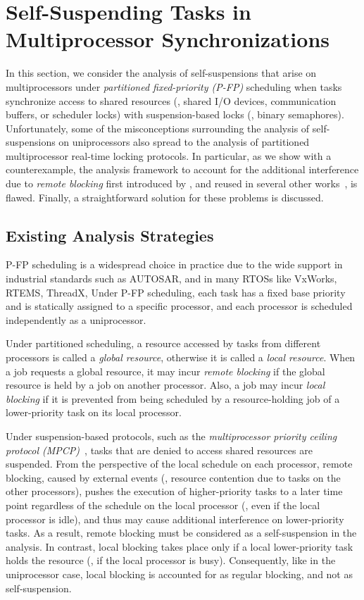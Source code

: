 \section{Self-Suspending Tasks in Multiprocessor Synchronizations}
\label{sec:syn}

In this section, we consider the analysis of self-suspensions that arise on multiprocessors under \emph{partitioned fixed-priority (P-FP)} scheduling when tasks synchronize access to shared resources (\eg, shared I/O devices, communication buffers, or scheduler locks) with suspension-based locks (\eg, binary semaphores). Unfortunately, some of the misconceptions surrounding the analysis of self-suspensions on uniprocessors also spread to the analysis of partitioned multiprocessor real-time locking protocols. In particular, as we show with a counterexample, the analysis framework to account for the additional interference due to \emph{remote blocking} first introduced by \cite{lakshmanan-2009}, and reused in several other works~\cite{zeng-2011,bbb-2013,yang-2013,kim-2014,han-2014,carminati-2014,yang-2014},  is flawed. Finally, a straightforward solution for these problems is discussed. 

\subsection{Existing Analysis Strategies}
\label{sec:papers}

P-FP scheduling is a widespread choice in practice due to the wide support in industrial standards such as AUTOSAR, and in many RTOSs like VxWorks, RTEMS, ThreadX, \etc Under P-FP scheduling, each task has a fixed base priority and is statically assigned to a specific processor, and each processor is scheduled independently as a uniprocessor. 

Under partitioned scheduling, a resource accessed by tasks from different processors is called a \emph{global resource}, otherwise it is called a \emph{local resource}. When a job requests a global resource, it may incur \emph{remote blocking} if the global resource is held by a job on another processor. Also, a job may incur \emph{local blocking} if it is prevented from being scheduled by a resource-holding job of a lower-priority task on its local processor. 

Under suspension-based protocols, such as the \emph{multiprocessor priority ceiling protocol (MPCP)}~\cite{rajkumar-1990}, tasks that are denied to access shared resources are suspended. From the perspective of the local schedule on each processor, remote blocking, caused by external events (\ie, resource contention due to tasks on the other processors), pushes the execution of higher-priority tasks to a later time point regardless of the schedule on the local processor (\ie, even if the local processor is idle), and thus may cause additional interference on lower-priority tasks. As a result, remote blocking must be considered as a self-suspension in the analysis. In contrast, local blocking takes place only if a local lower-priority task holds the resource (\ie, if the local processor is busy). Consequently, like in the uniprocessor case, local blocking is accounted for as regular blocking, and not as self-suspension.

